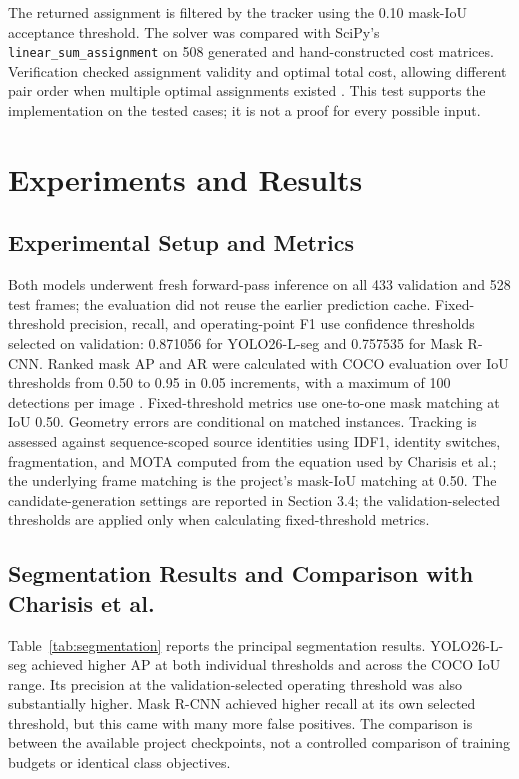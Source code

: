 \documentclass[11pt,a4paper]{article}
\begin{document}
The returned assignment is filtered by the tracker using the 0.10 mask-IoU acceptance threshold. The solver was compared with SciPy's \texttt{linear\_sum\_assignment} on 508 generated and hand-constructed cost matrices. Verification checked assignment validity and optimal total cost, allowing different pair order when multiple optimal assignments existed \cite{kuhn,scipy}. This test supports the implementation on the tested cases; it is not a proof for every possible input.

\section{Experiments and Results}

\subsection{Experimental Setup and Metrics}

Both models underwent fresh forward-pass inference on all 433 validation and 528 test frames; the evaluation did not reuse the earlier prediction cache. Fixed-threshold precision, recall, and operating-point F1 use confidence thresholds selected on validation: 0.871056 for YOLO26-L-seg and 0.757535 for Mask R-CNN. Ranked mask AP and AR were calculated with COCO evaluation over IoU thresholds from 0.50 to 0.95 in 0.05 increments, with a maximum of 100 detections per image \cite{coco}. Fixed-threshold metrics use one-to-one mask matching at IoU 0.50. Geometry errors are conditional on matched instances. Tracking is assessed against sequence-scoped source identities using IDF1, identity switches, fragmentation, and MOTA computed from the equation used by Charisis et al.; the underlying frame matching is the project's mask-IoU matching at 0.50. The candidate-generation settings are reported in Section 3.4; the validation-selected thresholds are applied only when calculating fixed-threshold metrics.

\subsection{Segmentation Results and Comparison with Charisis et al.}

Table~\ref{tab:segmentation} reports the principal segmentation results. YOLO26-L-seg achieved higher AP at both individual thresholds and across the COCO IoU range. Its precision at the validation-selected operating threshold was also substantially higher. Mask R-CNN achieved higher recall at its own selected threshold, but this came with many more false positives. The comparison is between the available project checkpoints, not a controlled comparison of training budgets or identical class objectives.
\end{document}
